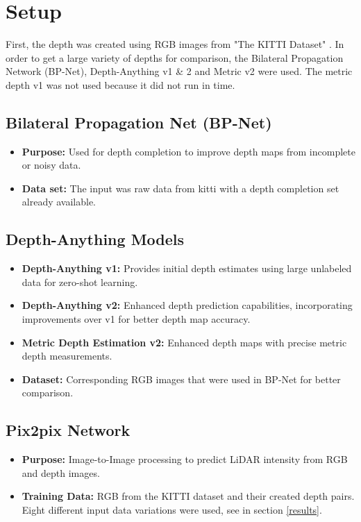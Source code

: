 \section{Setup}
First, the depth was created using RGB images from "The KITTI Dataset" \cite{Geiger2013IJRR}. In order to get a large variety of depths for comparison, the Bilateral Propagation Network (BP-Net), Depth-Anything v1 \& 2 and Metric v2 were used. The metric depth v1 was not used because it did not run in time.
\subsection{Bilateral Propagation Net (BP-Net)}
\begin{itemize}
	\item \textbf{Purpose:} Used for depth completion to improve depth maps from incomplete or noisy data.
	\item \textbf{Data set:} The input was raw data from kitti with a depth completion set already available. 
\end{itemize}

\subsection{Depth-Anything Models}
\begin{itemize}
	\item \textbf{Depth-Anything v1:} Provides initial depth estimates using large unlabeled data for zero-shot learning.
	\item \textbf{Depth-Anything v2:} Enhanced depth prediction capabilities, incorporating improvements over v1 for better depth map accuracy.


 	\item \textbf {Metric Depth Estimation v2:} Enhanced depth maps with precise metric depth measurements.

	\item \textbf{Dataset:} Corresponding RGB images that were used in BP-Net for better comparison.
\end{itemize}

\subsection{Pix2pix Network}
\begin{itemize}
	\item \textbf{Purpose:} Image-to-Image processing to predict LiDAR intensity from RGB and depth images. 
	\item \textbf{Training Data:} RGB from the KITTI dataset and their created depth pairs.
	Eight different input data variations were used, see in section \ref{results}.
\end{itemize}

